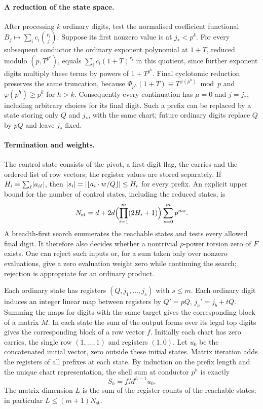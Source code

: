 \paragraph{A reduction of the state space.}
After processing $k$ ordinary digits, test the normalised coefficient
functional $B_j\mapsto\sum_ic_i\binom{r_i}{j}$. Suppose its first nonzero
value is at $j_*<p^k$. For every subsequent conductor the ordinary exponent
polynomial at $1+T$, reduced modulo $(p,T^{p^k})$, equals
$\sum_ic_i(1+T)^{r_i}$ in this quotient, since further exponent digits
multiply these terms by powers of $1+T^{p^k}$. Final cyclotomic reduction
preserves the same truncation, because
$\Phi_{p^h}(1+T)\equiv T^{\varphi(p^h)}\bmod p$ and $\varphi(p^h)\ge p^k$
for $h>k$. Consequently every continuation has $\mu=0$ and $j=j_*$,
including arbitrary choices for its final digit. Such a prefix can be
replaced by a state storing only $Q$ and $j_*$, with the same chart; future
ordinary digits replace $Q$ by $pQ$ and leave $j_*$ fixed.

\paragraph{Termination and weights.}
The control state consists of the pivot, a first-digit flag, the carries
and the ordered list of row vectors; the register values are stored
separately. If $H_i=\sum_\ell\lvert a_{i\ell}\rvert$, then
$\lvert s_i\rvert=\lvert\lfloor a_i\cdot w/Q\rfloor\rvert\le H_i$ for every prefix. An explicit
upper bound for the number of control states, including the reduced
states, is
\begin{equation}\label{gra:eq:states}
 N_{\mathrm{st}}=d+2d\Bigl(\prod_{i=1}^m(2H_i+1)\Bigr)\sum_{s=0}^mp^{ms}.
\end{equation}
A breadth-first search enumerates the reachable states and tests every
allowed final digit. It therefore also decides whether a nontrivial
$p$-power torsion zero of $F$ exists. One can reject such inputs or, for a
sum taken only over nonzero evaluations, give a zero evaluation weight
zero while continuing the search; rejection is appropriate for an ordinary
product.

Each ordinary state has registers $(Q,j_1,\dots,j_s)$ with $s\le m$. Each
ordinary digit induces an integer linear map between registers by $Q'=pQ$,
$j_a'=j_b+tQ$. Summing the maps for digits with the same target gives the
corresponding block of a matrix $M$. In each state the sum of the output
forms over its legal top digits gives the corresponding block of a row
vector $f$. Initially each chart has zero carries, the single row
$(1,\dots,1)$ and registers $(1,0)$. Let $u_0$ be the concatenated initial
vector, zero outside these initial states. Matrix iteration adds the
registers of all prefixes at each state. By induction on the prefix length
and the unique chart representation, the shell sum at conductor $p^h$ is
exactly
\begin{equation}\label{gra:eq:transfer}
 S_h=fM^{h-1}u_0 .
\end{equation}
The matrix dimension $L$ is the sum of the register counts of the
reachable states; in particular $L\le(m+1)N_{\mathrm{st}}$.

